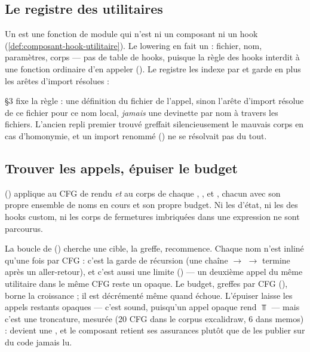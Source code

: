 \subsection{Le registre des utilitaires}

Un  est une fonction de module qui n'est ni un composant ni un hook (\cref{def:composant-hook-utilitaire}). Le lowering en fait un  : fichier, nom, paramètres, corps --- pas de table de hooks, puisque la règle des hooks interdit à une fonction ordinaire d'en appeler (). Le registre les indexe par  et garde en plus les arêtes d'import résolues :


 §3 fixe la règle : une définition du fichier de l'appel, sinon l'arête d'import résolue de ce fichier pour ce nom local, \emph{jamais} une devinette par nom à travers les fichiers. L'ancien repli \og premier trouvé\fg{} greffait silencieusement le mauvais corps en cas d'homonymie, et un import renommé () ne se résolvait pas du tout.

\subsection{Trouver les appels, épuiser le budget}

 () applique  au CFG de rendu \emph{et} au corps de chaque , ,  et , chacun avec son propre ensemble de noms en cours et son propre budget. Ni les  d'état, ni les  des hooks custom, ni les corps de fermetures imbriquées dans une expression ne sont parcourus.

La boucle de  () cherche une cible, la greffe, recommence. Chaque nom n'est inliné qu'une fois par CFG : c'est la garde de récursion (une chaîne  $\to$  $\to$  termine après un aller-retour), et c'est aussi une limite () --- un deuxième appel du même utilitaire dans le même CFG reste un  opaque. Le budget,  greffes par CFG (), borne la croissance ; il est décrémenté même quand  échoue. L'épuiser laisse les appels restants opaques --- c'est sound, puisqu'un appel opaque rend $\Top$ --- mais c'est une troncature, mesurée (20 CFG dans le corpus excalidraw, 6 dans memos) :  devient une \Info{} , et le composant retient ses assurances  plutôt que de les publier sur du code jamais lu.

